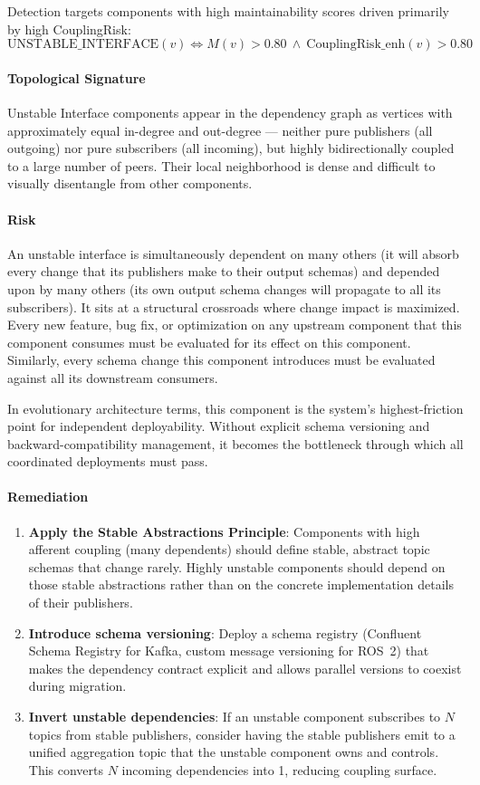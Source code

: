 \documentclass[11pt]{article}
\begin{document}
Detection targets components with high maintainability scores driven primarily by high CouplingRisk:
\[
\mathrm{UNSTABLE\_INTERFACE}(v) \Leftrightarrow M(v) > 0.80\ \land\ \mathrm{CouplingRisk\_enh}(v) > 0.80
\]

\paragraph{Topological Signature}
Unstable Interface components appear in the dependency graph as vertices with approximately equal in-degree and out-degree --- neither pure publishers (all outgoing) nor pure subscribers (all incoming), but highly bidirectionally coupled to a large number of peers. Their local neighborhood is dense and difficult to visually disentangle from other components.

\paragraph{Risk}
An unstable interface is simultaneously dependent on many others (it will absorb every change that its publishers make to their output schemas) and depended upon by many others (its own output schema changes will propagate to all its subscribers). It sits at a structural crossroads where change impact is maximized. Every new feature, bug fix, or optimization on any upstream component that this component consumes must be evaluated for its effect on this component. Similarly, every schema change this component introduces must be evaluated against all its downstream consumers.

In evolutionary architecture terms, this component is the system's highest-friction point for independent deployability. Without explicit schema versioning and backward-compatibility management, it becomes the bottleneck through which all coordinated deployments must pass.

\paragraph{Remediation}
\begin{enumerate}[leftmargin=*]
\item \textbf{Apply the Stable Abstractions Principle}: Components with high afferent coupling (many dependents) should define stable, abstract topic schemas that change rarely. Highly unstable components should depend on those stable abstractions rather than on the concrete implementation details of their publishers.
\item \textbf{Introduce schema versioning}: Deploy a schema registry (Confluent Schema Registry for Kafka, custom message versioning for ROS~2) that makes the dependency contract explicit and allows parallel versions to coexist during migration.
\item \textbf{Invert unstable dependencies}: If an unstable component subscribes to $N$ topics from stable publishers, consider having the stable publishers emit to a unified aggregation topic that the unstable component owns and controls. This converts $N$ incoming dependencies into 1, reducing coupling surface.
\end{enumerate}
\end{document}
